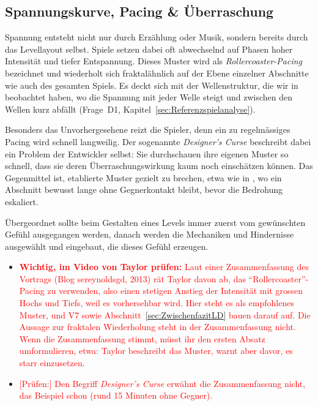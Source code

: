 \documentclass[../Main.tex]{subfiles}
\begin{document}
\subsection{Spannungskurve, Pacing \& Überraschung} \label{sec:Pacing}
Spannung entsteht nicht nur durch Erzählung oder Musik, sondern bereits durch das Levellayout selbst. Spiele setzen dabei oft abwechselnd auf Phasen hoher Intensität und tiefer Entspannung. Dieses Muster wird als \textit{Rollercoaster-Pacing} bezeichnet und wiederholt sich fraktalähnlich auf der Ebene einzelner Abschnitte wie auch des gesamten Spiels.\autocite{gdc_tenprinciples2010} Es deckt sich mit der Wellenstruktur, die wir in  beobachtet haben, wo die Spannung mit jeder Welle steigt und zwischen den Wellen kurz abfällt (Frage~D1, Kapitel~\ref{sec:Referenzspielanalyse}).

Besonders das Unvorhergesehene reizt die Spieler, denn ein zu regelmässiges Pacing wird schnell langweilig. Der sogenannte \textit{Designer's Curse} beschreibt dabei ein Problem der Entwickler selbst: Sie durchschauen ihre eigenen Muster so schnell, dass sie deren Überraschungswirkung kaum noch einschätzen können. Das Gegenmittel ist, etablierte Muster gezielt zu brechen, etwa wie in ,\autocite{visceral_deadspace2_2011} wo ein Abschnitt bewusst lange ohne Gegnerkontakt bleibt, bevor die Bedrohung eskaliert.\autocite{gdc_tenprinciples2010}

Übergeordnet sollte beim Gestalten eines Levels immer zuerst vom gewünschten Gefühl ausgegangen werden, danach werden die Mechaniken und Hindernisse ausgewählt und eingebaut, die dieses Gefühl erzeugen.\autocite{gdc_tenprinciples2010}

\begin{itemize}[leftmargin=1.5cm]
    \item \textcolor{red}{\textbf{Wichtig, im Video von Taylor prüfen:} Laut einer Zusammenfassung des Vortrags (Blog sereynoldsgd, 2013) rät Taylor davon ab, das \enquote{Rollercoaster}-Pacing zu verwenden, also einen stetigen Anstieg der Intensität mit grossen Hochs und Tiefs, weil es vorhersehbar wird. Hier steht es als empfohlenes Muster, und V7 sowie Abschnitt~\ref{sec:ZwischenfazitLD} bauen darauf auf. Die Aussage zur fraktalen Wiederholung steht in der Zusammenfassung nicht. Wenn die Zusammenfassung stimmt, müsst ihr den ersten Absatz umformulieren, etwa: Taylor beschreibt das Muster, warnt aber davor, es starr einzusetzen.}
    \item \textcolor{red}{[Prüfen:] Den Begriff \textit{Designer's Curse} erwähnt die Zusammenfassung nicht, das Beispiel  schon (rund 15 Minuten ohne Gegner).}
\end{itemize}
\end{document}
